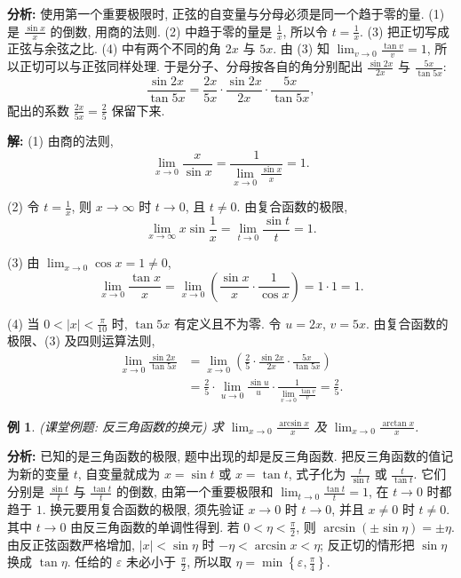 \documentclass[UTF8,openany]{ctexbook}
\theoremstyle{chinesetextbook}
\newtheorem{example}{例}[section]
\newenvironment{cnsolution}{\par\indent\textbf{解:} \ignorespaces}{\par}
\begin{document}
\par\indent\textbf{分析:} 使用第一个重要极限时, 正弦的自变量与分母必须是同一个趋于零的量. (1) 是 $\displaystyle\frac{\sin x}x$ 的倒数, 用商的法则. (2) 中趋于零的量是 $\displaystyle\frac1x$, 所以令 $\displaystyle t=\frac1x$. (3) 把正切写成正弦与余弦之比. (4) 中有两个不同的角 $2x$ 与 $5x$. 由 (3) 知 $\displaystyle\lim_{v\to0}\frac{\tan v}v=1$, 所以正切可以与正弦同样处理. 于是分子、分母按各自的角分别配出 $\displaystyle\frac{\sin2x}{2x}$ 与 $\displaystyle\frac{5x}{\tan5x}$:
\[
\frac{\sin2x}{\tan5x}=\frac{2x}{5x}\cdot\frac{\sin2x}{2x}\cdot\frac{5x}{\tan5x},
\]
配出的系数 $\displaystyle\frac{2x}{5x}=\frac25$ 保留下来.
\begin{cnsolution}
(1) 由商的法则,
\[
\lim_{x\to0}\frac x{\sin x}=\frac1{\displaystyle\lim_{x\to0}\frac{\sin x}x}=1.
\]

(2) 令 $\displaystyle t=\frac1x$, 则 $x\to\infty$ 时 $t\to0$, 且 $t\ne0$. 由复合函数的极限,
\[
\lim_{x\to\infty}x\sin\frac1x=\lim_{t\to0}\frac{\sin t}t=1.
\]

(3) 由 $\displaystyle\lim_{x\to0}\cos x=1\ne0$,
\[
\lim_{x\to0}\frac{\tan x}x=\lim_{x\to0}\left(\frac{\sin x}x\cdot\frac1{\cos x}\right)=1\cdot1=1.
\]

(4) 当 $\displaystyle0<|x|<\frac\pi{10}$ 时, $\tan5x$ 有定义且不为零. 令 $u=2x$, $v=5x$. 由复合函数的极限、(3) 及四则运算法则,
\[
\begin{aligned}
\lim_{x\to0}\frac{\sin2x}{\tan5x}
&=\lim_{x\to0}\left(\frac25\cdot\frac{\sin2x}{2x}\cdot\frac{5x}{\tan5x}\right)\\
&=\frac25\cdot\lim_{u\to0}\frac{\sin u}u\cdot\frac1{\displaystyle\lim_{v\to0}\frac{\tan v}v}=\frac25.
\end{aligned}
\]
\end{cnsolution}
\begin{example}
\textnormal{(课堂例题: 反三角函数的换元)} 求 $\displaystyle\lim_{x\to0}\frac{\arcsin x}x$ 及 $\displaystyle\lim_{x\to0}\frac{\arctan x}x$.
\end{example}
\par\indent\textbf{分析:} 已知的是三角函数的极限, 题中出现的却是反三角函数. 把反三角函数的值记为新的变量 $t$, 自变量就成为 $x=\sin t$ 或 $x=\tan t$, 式子化为 $\displaystyle\frac t{\sin t}$ 或 $\displaystyle\frac t{\tan t}$. 它们分别是 $\displaystyle\frac{\sin t}t$ 与 $\displaystyle\frac{\tan t}t$ 的倒数, 由第一个重要极限和 $\displaystyle\lim_{t\to0}\frac{\tan t}t=1$, 在 $t\to0$ 时都趋于 $1$. 换元要用复合函数的极限, 须先验证 $x\to0$ 时 $t\to0$, 并且 $x\ne0$ 时 $t\ne0$. 其中 $t\to0$ 由反三角函数的单调性得到. 若 $\displaystyle0<\eta<\frac\pi2$, 则 $\arcsin(\pm\sin\eta)=\pm\eta$. 由反正弦函数严格增加, $|x|<\sin\eta$ 时 $-\eta<\arcsin x<\eta$; 反正切的情形把 $\sin\eta$ 换成 $\tan\eta$. 任给的 $\varepsilon$ 未必小于 $\displaystyle\frac\pi2$, 所以取 $\displaystyle\eta=\min\left\{\varepsilon,\frac\pi4\right\}$.
\end{document}
